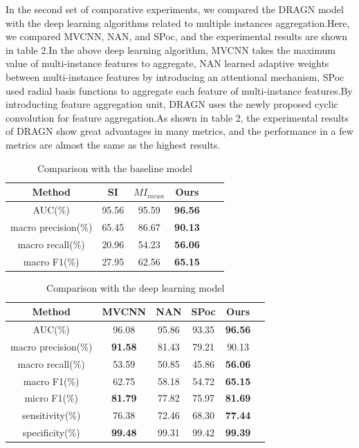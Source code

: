 \documentclass[10pt,twocolumn,letterpaper]{article}
\begin{document}
In the second set of comparative experiments, we compared the DRAGN model with the deep learning algorithms related to multiple instances aggregation.Here, we compared MVCNN, NAN, and SPoc\cite{ref28}, and the experimental results are shown in table 2.In the above deep learning algorithm, MVCNN takes the maximum value of multi-instance features to aggregate, NAN learned adaptive weights between multi-instance features by introducing an attentional mechanism, SPoc used radial basis functions to aggregate each feature of multi-instance features.By introducting feature aggregation unit, DRAGN uses the newly proposed cyclic convolution for feature aggregation.As shown in table 2, the experimental results of DRAGN show great advantages in many metrics, and the performance in a few metrics are almost the same as the highest results.

\begin{table}
\normalsize
\begin{center}
\begin{tabular}{|c|c|c|c|c|c|}
\hline
Method & SI & $MI_{mean}$ & Ours \\
\hline\hline
AUC(\%) & 95.56 & 95.59  & \textbf{96.56} \\
macro precision(\%) & 65.45 & 86.67 & \textbf{90.13} \\
macro recall(\%) & 20.96 & 54.23 & \textbf{56.06} \\
macro F1(\%) & 27.95 & 62.56 & \textbf{65.15} \\
\hline
\end{tabular}
\end{center}
\caption{Comparison with the baseline model}
\end{table}

\begin{table}
\normalsize
\begin{center}
\begin{tabular}{|c|c|c|c|c|c|}
\hline
Method & MVCNN & NAN & SPoc & Ours \\
\hline\hline
AUC(\%) & 96.08 & 95.86 & 93.35 & \textbf{96.56} \\
macro precision(\%) & \textbf{91.58} & 81.43 & 79.21 & 90.13 \\
macro recall(\%) & 53.59 & 50.85 & 45.86 & \textbf{56.06}\\
macro F1(\%) & 62.75 & 58.18 & 54.72 & \textbf{65.15} \\
micro F1(\%) & \textbf{81.79} & 77.82 & 75.97 & \textbf{81.69} \\
sensitivity(\%) & 76.38 & 72.46 & 68.30 & \textbf{77.44} \\
specificity(\%) & \textbf{99.48} & 99.31 & 99.42 & \textbf{99.39} \\
\hline
\end{tabular}
\end{center}
\caption{Comparison with the deep learning model}
\end{table}
\end{document}
